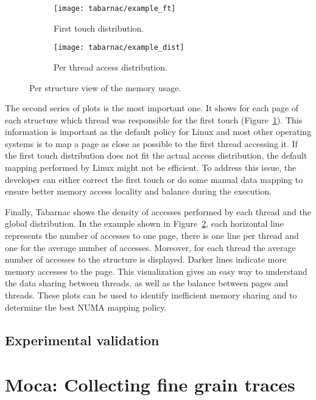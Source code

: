 \begin{figure}[htb]
    \centering
    \begin{subfigure}{.49\linewidth}
        \texttt{[image: tabarnac/example\_ft]}
        \caption{First touch distribution.}
        \label{fig:example_ft}
    \end{subfigure}
    \begin{subfigure}{.49\linewidth}
        \texttt{[image: tabarnac/example\_dist]}
        \caption{Per thread access distribution.}
        \label{fig:example_dist}
    \end{subfigure}
    \caption{Per structure view of the memory usage.}
    \label{fig:example_by_structs}
\end{figure}

The second series of plots is the most important one.
It shows for each page of each structure which thread was responsible for the first touch (Figure~\ref{fig:example_ft}).
This information is important as the default policy for \gls{Linux} and most other operating systems is to map a page as close as possible to the first thread accessing it.
If the first touch distribution does not fit the actual access distribution, the default mapping performed by \gls{Linux} might not be efficient.
To address this issue, the developer can either correct the first touch or do some manual data mapping to ensure better memory access locality and balance during the execution.

Finally, \gls{Tabarnac} shows the density of accesses performed by each thread and the global distribution.
In the example shown in Figure~\ref{fig:example_dist}, each horizontal line represents the number of accesses to one page, there is one line per thread and one for the average number of accesses.
Moreover, for each thread the average number of accesses to the structure is displayed.
Darker lines indicate more memory accesses to the page. This visualization gives an easy way to understand the data sharing between threads, as well as the balance between pages and
threads.
These plots can be used to identify inefficient memory sharing and to determine the best \gls{NUMA} mapping policy.

\subsection{Experimental validation}



\section{Moca: Collecting fine grain traces}
\label{sec:Moca}


